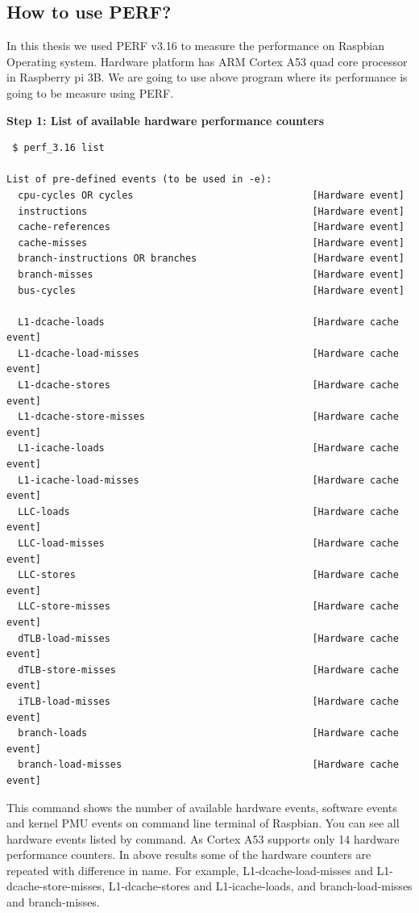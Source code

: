 \subsection{How to use PERF?}
In this thesis we used PERF v3.16 to measure the performance on Raspbian Operating system. Hardware platform has ARM Cortex A53 quad core processor in Raspberry pi 3B. We are going to use above program where its performance is going to be measure using PERF. 

  \textbf{Step 1: List of available hardware performance counters}
  
\begin{lstlisting}
 $ perf_3.16 list
 
List of pre-defined events (to be used in -e):
  cpu-cycles OR cycles                               [Hardware event]
  instructions                                       [Hardware event]
  cache-references                                   [Hardware event]
  cache-misses                                       [Hardware event]
  branch-instructions OR branches                    [Hardware event]
  branch-misses                                      [Hardware event]
  bus-cycles                                         [Hardware event]

  L1-dcache-loads                                    [Hardware cache event]
  L1-dcache-load-misses                              [Hardware cache event]
  L1-dcache-stores                                   [Hardware cache event]
  L1-dcache-store-misses                             [Hardware cache event]
  L1-icache-loads                                    [Hardware cache event]
  L1-icache-load-misses                              [Hardware cache event]
  LLC-loads                                          [Hardware cache event]
  LLC-load-misses                                    [Hardware cache event]
  LLC-stores                                         [Hardware cache event]
  LLC-store-misses                                   [Hardware cache event]
  dTLB-load-misses                                   [Hardware cache event]
  dTLB-store-misses                                  [Hardware cache event]
  iTLB-load-misses                                   [Hardware cache event]
  branch-loads                                       [Hardware cache event]
  branch-load-misses                                 [Hardware cache event]

\end{lstlisting}

This command shows the number of available hardware events, software events and kernel PMU events on command line terminal of Raspbian. You can see all hardware events listed by command. As Cortex A53 supports only 14 hardware performance counters. In above results some of the hardware counters are repeated with difference in name. For example, L1-dcache-load-misses and L1-dcache-store-misses, L1-dcache-stores  and L1-icache-loads, and branch-load-misses and branch-misses.

